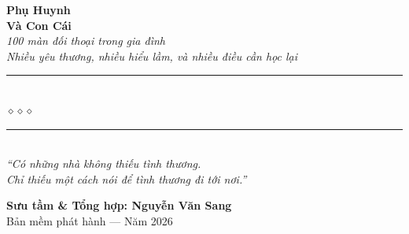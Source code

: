 \begin{titlepage}
\begin{center}
  {\fontsize{32}{38}\selectfont\bfseries\color{inkdark!80!black}
    Phụ Huynh}\\[0.35cm]
  {\fontsize{32}{38}\selectfont\bfseries\color{clayrose!85!black}
    Và Con Cái}\\[0.4cm]

  {\fontsize{16}{20}\selectfont\color{clayrose!90!black}\itshape
    100 màn đối thoại trong gia đình\\
    Nhiều yêu thương, nhiều hiểu lầm, và nhiều điều cần học lại}\\[1cm]

  {\color{deepsea!60}\rule{6cm}{1pt}}\\[5pt]
  {\color{clayrose!80!black}\large$\diamond$\hspace{1cm}$\diamond$\hspace{1cm}$\diamond$}\\[5pt]
  {\color{deepsea!60}\rule{6cm}{1pt}}\\[1.5cm]

  {\normalsize\itshape\color{deepsea!90!black}
   ``Có những nhà không thiếu tình thương.\\
   Chỉ thiếu một cách nói để tình thương đi tới nơi.''}

  \vfill

  {\fontsize{16}{20}\selectfont\bfseries\color{deepsea!90!black}
    Sưu tầm \& Tổng hợp: \textbf{Nguyễn Văn Sang}}\\[0.4cm]

  {\small\color{gray} Bản mềm phát hành --- Năm 2026}\\[0.5cm]
\end{center}

\afterpage{\nopagecolor}
\end{titlepage}